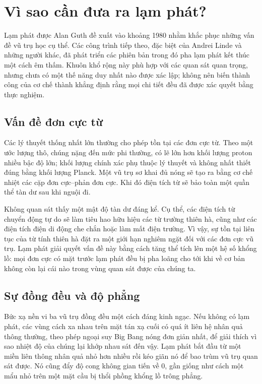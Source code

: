\section{Vì sao cần đưa ra lạm phát?}

Lạm phát được Alan Guth đề xuất vào khoảng 1980 nhằm khắc phục những vấn đề vũ trụ học cụ thể. Các công trình tiếp theo, đặc biệt của Andrei Linde và những người khác, đã phát triển các phiên bản trong đó pha lạm phát kết thúc một cách êm thấm. Khuôn khổ rộng này phù hợp với các quan sát quan trọng, nhưng chưa có một thế năng duy nhất nào được xác lập; không nên biến thành công của cơ chế thành khẳng định rằng mọi chi tiết đều đã được xác quyết bằng thực nghiệm.

\subsection{Vấn đề đơn cực từ}

Các lý thuyết thống nhất lớn thường cho phép tồn tại các đơn cực từ. Theo một ước lượng thô, chúng nặng đến mức phi thường, có lẽ lớn hơn khối lượng proton nhiều bậc độ lớn; khối lượng chính xác phụ thuộc lý thuyết và không nhất thiết đúng bằng khối lượng Planck. Một vũ trụ sơ khai đủ nóng sẽ tạo ra bằng cơ chế nhiệt các cặp đơn cực--phản đơn cực. Khi đó điện tích từ sẽ bảo toàn một quần thể tàn dư sau khi nguội đi.

Không quan sát thấy một mật độ tàn dư đáng kể. Cụ thể, các điện tích từ chuyển động tự do sẽ làm tiêu hao hữu hiệu các từ trường thiên hà, cũng như các điện tích điện di động che chắn hoặc làm mất điện trường. Vì vậy, sự tồn tại liên tục của từ tính thiên hà đặt ra một giới hạn nghiêm ngặt đối với các đơn cực vũ trụ. Lạm phát giải quyết vấn đề này bằng cách tăng thể tích lên một hệ số khổng lồ: mọi đơn cực có mặt trước lạm phát đều bị pha loãng cho tới khi về cơ bản không còn lại cái nào trong vùng quan sát được của chúng ta.

\subsection{Sự đồng đều và độ phẳng}

Bức xạ nền vi ba vũ trụ đồng đều một cách đáng kinh ngạc. Nếu không có lạm phát, các vùng cách xa nhau trên mặt tán xạ cuối có quá ít liên hệ nhân quả thông thường, theo phép ngoại suy Big Bang nóng đơn giản nhất, để giải thích vì sao nhiệt độ của chúng lại khớp nhau sát đến vậy. Lạm phát bắt đầu từ một miền liên thông nhân quả nhỏ hơn nhiều rồi kéo giãn nó để bao trùm vũ trụ quan sát được. Nó cũng đẩy độ cong không gian tiến về 0, gần giống như cách một mẩu nhỏ trên một mặt cầu bị thổi phồng khổng lồ trông phẳng.


